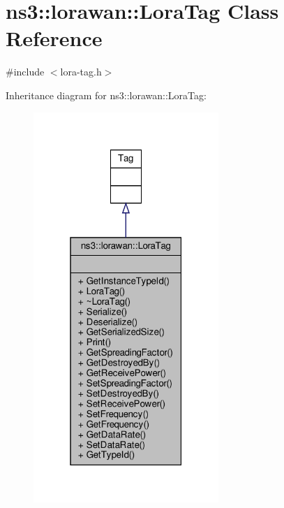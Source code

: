 \hypertarget{classns3_1_1lorawan_1_1LoraTag}{}\section{ns3\+:\+:lorawan\+:\+:Lora\+Tag Class Reference}
\label{classns3_1_1lorawan_1_1LoraTag}


{\ttfamily \#include $<$lora-\/tag.\+h$>$}



Inheritance diagram for ns3\+:\+:lorawan\+:\+:Lora\+Tag\+:
\nopagebreak
\begin{figure}[H]
\begin{center}
\leavevmode
\includegraphics[width=199pt]{classns3_1_1lorawan_1_1LoraTag__inherit__graph}
\end{center}
\end{figure}


